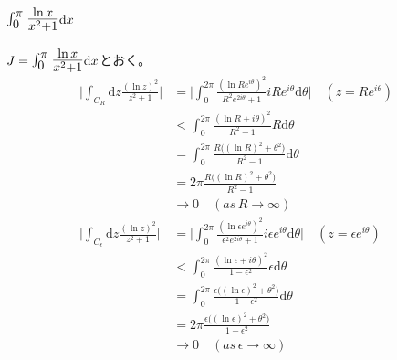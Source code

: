 \documentclass[dvipdfmx,a4paper]{jsarticle}
\begin{document}
 \subsection{$\mbox{\Large $\int_0^{\pi}\frac{\ln{x}}{x^2 + 1}$}\mathrm{d}x$}
 $J = \mbox{\Large $\int_0^{\pi}\frac{\ln{x}}{x^2 + 1}$}\mathrm{d}x$とおく。
 \begin{align*}
 \biggl|\int_{C_R}\mathrm{d}z\frac{(\ln{z})^2}{z^2 + 1}\biggr| &= \biggl|\int_0^{2\pi}\frac{(\ln{Re^{i\theta}})^2}{R^2e^{2i\theta} + 1}iRe^{i\theta}\mathrm{d}\theta\biggr|\quad(z = Re^{i\theta})\\
 &< \int_0^{2\pi}\frac{(\ln{R} + i\theta)^2}{R^2 - 1}R\mathrm{d}\theta\\
 &= \int_0^{2\pi}\frac{R\bigl((\ln{R})^2 + \theta^2\bigr)}{R^2 - 1}\mathrm{d}\theta\\
 &=2\pi\frac{R\bigl((\ln{R})^2 + \theta^2\bigr)}{R^2 - 1}\\
 &\to 0 \quad(as\, R \to \infty)\\
 \biggl|\int_{C_{\epsilon}}\mathrm{d}z\frac{(\ln{z})^2}{z^2 + 1}\biggr| &= \biggl|\int_0^{2\pi}\frac{(\ln{\epsilon e^{i\theta}})^2}{\epsilon^2e^{2i\theta} + 1}i\epsilon e^{i\theta}\mathrm{d}\theta\biggr|\quad(z = \epsilon e^{i\theta})\\
 &< \int_0^{2\pi}\frac{(\ln{\epsilon} + i\theta)^2}{1 - \epsilon^2}\epsilon\mathrm{d}\theta\\
 &= \int_0^{2\pi}\frac{\epsilon\bigl((\ln{\epsilon})^2 + \theta^2\bigr)}{1 - \epsilon^2}\mathrm{d}\theta\\
 &=2\pi\frac{\epsilon\bigl((\ln{\epsilon})^2 + \theta^2\bigr)}{1 - \epsilon^2}\\
 &\to 0 \quad(as\, \epsilon \to \infty)
 \end{align*}
\end{document}
